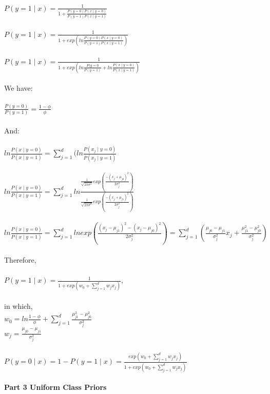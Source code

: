 \documentclass[12pt]{article}
\begin{document}
\\
$P(y = 1 \mid x) = \frac {1} {1 + \frac{P(y = 0) P(x \mid y = 0)}{P(y = 1)P(x \mid y = 1)}}$
\\
\\
$P(y = 1 \mid x) = \frac {1} {1 + exp(ln \frac {P(y = 0) P(x \mid y = 0)}{P(y = 1)P(x \mid y = 1)})}$
\\
\\
$P(y = 1 \mid x) = \frac {1} {1 + exp(ln \frac {P(y = 0}{P(y = 1)} + ln \frac{P(x \mid y = 0)}{P(x \mid y = 1)})}$
\\
\\
We have:
\\
\\
$\frac {P(y = 0)}{P(y = 1)} =  \frac {1 - \phi}{\phi}$
\\
\\
And:
\\
\\
$ln \frac{P(x \mid y = 0)}{P(x \mid y = 1)} = \sum_{j=1}^d (ln \frac {P(x_j \mid y = 0)} {P(x_j \mid y = 1)}$
\\ 
\\
$ln \frac{P(x \mid y = 0)}{P(x \mid y = 1)} =\sum_{j=1}^d ln \frac {\frac{1}{\sqrt{2\pi \sigma ^2}} exp (\frac {-(x_j + \mu_{j 0})^2}{2\sigma_j^2})}{\frac{1}{\sqrt{2\pi \sigma ^2}} exp (\frac {-(x_j + \mu_{j 1})^2}{2\sigma_j^2})} $
\\
\\
$ln \frac{P(x \mid y = 0)}{P(x \mid y = 1)} =\sum_{j=1}^d ln exp (\frac {(x_j - \mu_{j 1})^2 - (x_j - \mu_{j 0})^2} {2\sigma_j^2}) = \sum_{j=1}^d (\frac{\mu_{j 0} - \mu_{j 1}}{\sigma_j^2} x_j + \frac{\mu_{j 1} ^2 - \mu_{j 0} ^2} {\sigma_j^2})$
\\
\\
Therefore,
\\
\\
$P(y = 1 \mid x) = \frac{1}{1 + exp (w_0 + \sum_{j=1}^d w_j x_j)}$,
\\
\\
in which,
\\
$w_0 = ln \frac {1-\phi}{\phi} + \sum_{j=1}^d \frac{\mu_{j 1} ^2 - \mu_{j 0} ^2} {\sigma_j^2}$
\\
$w_j = \frac{\mu_{j 0} - \mu_{j 1}}{\sigma_j^2}$
\\
\\
$P(y = 0 \mid x) = 1 - P(y = 1\mid x) = \frac{exp(w_0 + \sum_{j=1}^d w_j x_j)} {1 + exp (w_0 + \sum_{j=1}^d w_j x_j)}$
\\
\\
\noindent \textbf{Part 3 Uniform Class Priors}
\end{document}
